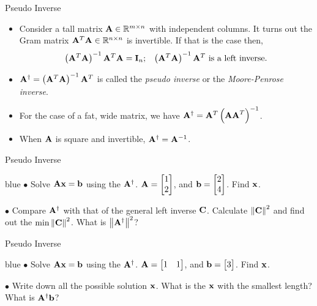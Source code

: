 \documentclass[aspectratio=169]{beamer}
\let\olditem\item
\renewcommand{\item}{\setlength{\itemsep}{\fill}\olditem}
\def\mf{\ensuremath\mathbf}
\def\mb{\ensuremath\mathbb}
\def\lV{\ensuremath\left\lVert}
\def\rV{\ensuremath\right\rVert}
\begin{document}
\begin{frame}[t]{Pseudo Inverse}
\begin{itemize}
    \item Consider a tall matrix $\mf{A} \in \mb{R}^{m \times n}$ with independent columns. It turns out the Gram matrix $\mf{A}^T\mf{A} \in \mb{R}^{n \times n}$ is invertible. If that is the case then,
    \[ \left(\mf{A}^T\mf{A}\right)^{-1}\mf{A}^T\mf{A} = \mf{I}_n; \,\,\,\,\, \left(\mf{A}^T\mf{A}\right)^{-1}\mf{A}^T \text{ is a left inverse.} \]
    \item $\mf{A}^{\dagger} = \left(\mf{A}^T\mf{A}\right)^{-1}\mf{A}^T$ is called the \textit{pseudo inverse} or the \textit{Moore-Penrose inverse}.

    \item For the case of a fat, wide matrix, we have $\mf{A}^{\dagger} = \mf{A}^T\left(\mf{AA}^T\right)^{-1}$.

    \item When $\mf{A}$ is square and invertible, $\mf{A}^{\dagger} = \mf{A}^{-1}$.
\end{itemize}
\end{frame}


\begin{frame}[t]{Pseudo Inverse}
\begin{color}{blue}
    $\bullet$ Solve $\mf{Ax} = \mf{b}$ using the $\mf{A}^\dagger$. $\mf{A} = \begin{bmatrix*}[r]1\\2\end{bmatrix*}$, and $\mf{b} = \begin{bmatrix*}2\\4\end{bmatrix*}$. Find $\mf{x}$.\\
    \vspace{2cm}

    $\bullet$ Compare $\mf{A}^\dagger$ with that of the general left inverse $\mf{C}$. Calculate $\lV \mf{C} \rV^2$ and find out the $\min \lV\mf{C}\rV^2$. What is $\lV\mf{A}^\dagger\rV^2$?
\end{color}
\end{frame}



\begin{frame}[t]{Pseudo Inverse}
\begin{color}{blue}
    $\bullet$ Solve $\mf{Ax} = \mf{b}$ using the $\mf{A}^\dagger$. $\mf{A} = \begin{bmatrix*}[r]1 & 1\end{bmatrix*}$, and $\mf{b} = \begin{bmatrix*}3\end{bmatrix*}$. Find $\mf{x}$.\\
    \vspace{2cm}

    $\bullet$ Write down all the possible solution $\mf{x}$. What is the $\mf{x}$ with the smallest length? What is $\mf{A}^\dagger \mf{b}$?
\end{color}
\end{frame}
\end{document}

